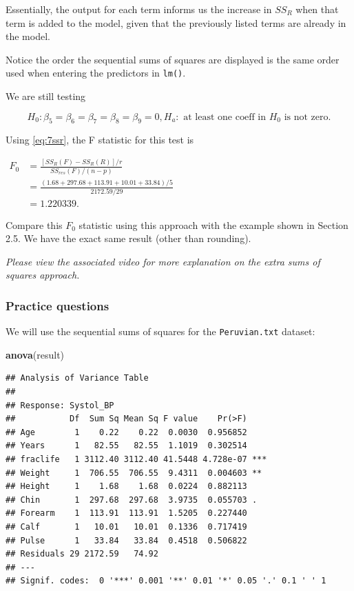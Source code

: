 \documentclass[
]{book}
\newenvironment{Shaded}{\begin{snugshade}}{\end{snugshade}}
\newcommand{\FunctionTok}[1]{\textcolor[rgb]{0.13,0.29,0.53}{\textbf{#1}}}
\newcommand{\NormalTok}[1]{#1}
\begin{document}
Essentially, the output for each term informs us the increase in \(SS_R\) when that term is added to the model, given that the previously listed terms are already in the model.

Notice the order the sequential sums of squares are displayed is the same order used when entering the predictors in \texttt{lm()}.

We are still testing

\[
H_0: \beta_5 = \beta_6 = \beta_7 = \beta_8 = \beta_9 = 0, H_a: \text{ at least one coeff in } H_0 \text{ is not zero}.
\]

Using \eqref{eq:7ssr}, the F statistic for this test is

\(\begin{aligned} F_0 &= \frac{[SS_R(F)-SS_R(R)]/r}{SS_{res}(F)/(n-p)} \\  &= \frac{(1.68+297.68+113.91+10.01+33.84)/5}{2172.59/29}\\  &= 1.220339. \end{aligned}\)

Compare this \(F_0\) statistic using this approach with the example shown in Section 2.5. We have the exact same result (other than rounding).

\emph{Please view the associated video for more explanation on the extra sums of squares approach.}

\hypertarget{practice-questions-3}{%
\subsubsection{Practice questions}\label{practice-questions-3}}

We will use the sequential sums of squares for the \texttt{Peruvian.txt} dataset:

\begin{Shaded}
\begin{Highlighting}[]
\FunctionTok{anova}\NormalTok{(result)}
\end{Highlighting}
\end{Shaded}

\begin{verbatim}
## Analysis of Variance Table
## 
## Response: Systol_BP
##           Df  Sum Sq Mean Sq F value    Pr(>F)    
## Age        1    0.22    0.22  0.0030  0.956852    
## Years      1   82.55   82.55  1.1019  0.302514    
## fraclife   1 3112.40 3112.40 41.5448 4.728e-07 ***
## Weight     1  706.55  706.55  9.4311  0.004603 ** 
## Height     1    1.68    1.68  0.0224  0.882113    
## Chin       1  297.68  297.68  3.9735  0.055703 .  
## Forearm    1  113.91  113.91  1.5205  0.227440    
## Calf       1   10.01   10.01  0.1336  0.717419    
## Pulse      1   33.84   33.84  0.4518  0.506822    
## Residuals 29 2172.59   74.92                      
## ---
## Signif. codes:  0 '***' 0.001 '**' 0.01 '*' 0.05 '.' 0.1 ' ' 1
\end{verbatim}
\end{document}
